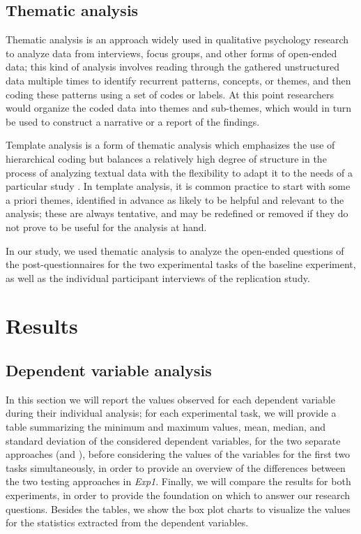 \subsection{Thematic analysis}
Thematic analysis is an approach widely used in qualitative psychology research to analyze data from interviews, focus groups, and other forms of open-ended data; this kind of analysis involves reading through the gathered unstructured data multiple times to identify recurrent patterns, concepts, or themes, and then coding these patterns using a set of codes or labels. At this point researchers would organize the coded data into themes and sub-themes, which would in turn be used to construct a narrative or a report of the findings.

Template analysis is a form of thematic analysis which emphasizes the use of hierarchical coding but balances a relatively high degree of structure in the process of analyzing textual data with the flexibility to adapt it to the needs of a particular study \cite{ThematicAnalysis}. In template analysis, it is common practice to start with some a priori themes, identified in advance as likely to be helpful and relevant to the analysis; these are always tentative, and may be redefined or removed if they do not prove to be useful for the analysis at hand. 

In our study, we used thematic analysis to analyze the open-ended questions of the post-questionnaires for the two experimental tasks of the baseline experiment, as well as the individual participant interviews of the replication study.



\section{Results}
\subsection{Dependent variable analysis}
In this section we will report the values observed for each dependent variable during their individual analysis; for each experimental task, we will provide a table summarizing the minimum and maximum values, mean, median, and standard deviation of the considered dependent variables, for the two separate approaches (\ie \tdd and \notdd), before considering the values of the variables for the first two tasks simultaneously, in order to provide an overview of the differences between the two testing approaches in \textit{Exp1}.
Finally, we will compare the results for both experiments, in order to provide the foundation on which to answer our research questions.
Besides the tables, we show the box plot charts to visualize the values for the statistics extracted from the dependent variables.

